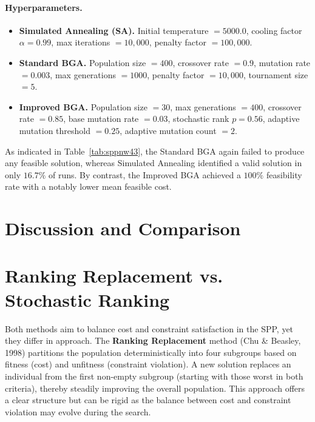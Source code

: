 \documentclass[12pt]{article}
\begin{document}
\paragraph{Hyperparameters.}
\vspace{-0.75em}
\begin{itemize}
    \item \textbf{Simulated Annealing (SA).}
    Initial temperature $= 5000.0$, 
    cooling factor $\alpha = 0.99$, 
    max iterations $= 10{,}000$, 
    penalty factor $= 100{,}000$. 
    
    \item \textbf{Standard BGA.}
    Population size $= 400$, 
    crossover rate $= 0.9$, 
    mutation rate $= 0.003$, 
    max generations $= 1000$, 
    penalty factor $= 10{,}000$, 
    tournament size $= 5$. 
    
    \item \textbf{Improved BGA.}
    Population size $= 30$, 
    max generations $= 400$, 
    crossover rate $= 0.85$, 
    base mutation rate $= 0.03$, 
    stochastic rank $p = 0.56$, 
    adaptive mutation threshold $= 0.25$, 
    adaptive mutation count $= 2$.
\end{itemize}

\noindent
As indicated in Table~\ref{tab:sppnw43}, the Standard BGA again failed to produce any feasible solution, whereas Simulated Annealing identified a valid solution in only $16.7\%$ of runs. By contrast, the Improved BGA achieved a $100\%$ feasibility rate with a notably lower mean feasible cost.


\section{Discussion and Comparison}
\label{sec:discussion}


\section{Ranking Replacement vs. Stochastic Ranking}
\label{sec:ranking}
Both methods aim to balance cost and constraint satisfaction in the SPP, yet they differ in approach. The \textbf{Ranking Replacement} method (Chu \& Beasley, 1998) partitions the population deterministically into four subgroups based on fitness (cost) and unfitness (constraint violation). A new solution replaces an individual from the first non-empty subgroup (starting with those worst in both criteria), thereby steadily improving the overall population. This approach offers a clear structure but can be rigid as the balance between cost and constraint violation may evolve during the search.
\end{document}
